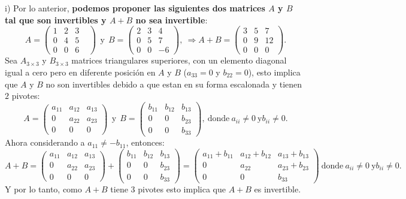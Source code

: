 \documentclass[11pt,letterpaper]{article}
\begin{document}
\begin{enumerate}
i) Por lo anterior, \textbf{podemos proponer las siguientes dos matrices $A$ y $B$ tal que son invertibles y $A+B$ no sea invertible}:
$$A=\begin{pmatrix}
1&2&3\\
0&4&5&\\
0&0&6
\end{pmatrix} \ \ \text{y}\ \ B=\begin{pmatrix}
2&3&4\\
0&5&7\\
0&0&-6
\end{pmatrix}, \ \Rightarrow A+B=\begin{pmatrix}
3&5&7\\
0&9&12\\
0&0&0
\end{pmatrix}.$$
Sea $A_{3\times 3}$ y $B_{3\times 3}$ matrices triangulares superiores, con un elemento diagonal igual a cero pero en diferente posición en $A$ y $B$ ($a_{33}=0$ y $b_{22}=0$), esto implica que $A$ y $B$ no son invertibles debido a que estan en su forma escalonada y tienen $2$ pivotes:
$$A=\begin{pmatrix}
a_{11} & a_{12}& a_{13}\\
0 & a_{22} & a_{23}\\
0 &0&0
\end{pmatrix}\ \ \text{y} \ \ B=\begin{pmatrix}
b_{11} & b_{12}& b_{13}\\
0 &0 & b_{23}\\
0 &0&b_{33}
\end{pmatrix},\ \text{donde} \ a_{ii}\neq 0 \ \text{y} b_{ii}\neq 0.$$
Ahora considerando a $a_{11}\neq -b_{11}$, entonces:
$$A+B=\begin{pmatrix}
a_{11} & a_{12}& a_{13}\\
0 & a_{22} & a_{23}\\
0 &0&0
\end{pmatrix}+\begin{pmatrix}
b_{11} & b_{12}& b_{13}\\
0 &0 & b_{23}\\
0 &0&b_{33}
\end{pmatrix}=\begin{pmatrix}
a_{11}+b_{11} & a_{12}+b_{12}& a_{13}+b_{13}\\
0 &a_{22} & a_{23}+b_{23}\\
0 &0&b_{33}
\end{pmatrix}\ \text{donde} \ a_{ii}\neq 0 \ \text{y} b_{ii}\neq 0.$$
Y por lo tanto, como $A+B$ tiene 3 pivotes esto implica que $A+B$ es invertible.\\


\end{enumerate}
\end{document}
